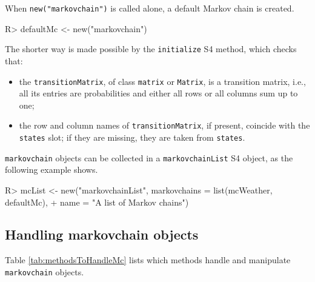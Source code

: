 \documentclass[
  nojss]{jss}
\providecommand{\tightlist}{%
  \setlength{\itemsep}{0pt}\setlength{\parskip}{0pt}}
\begin{document}
When \texttt{new("markovchain")} is called alone, a default Markov chain is created.

\begin{CodeChunk}
\begin{CodeInput}
R> defaultMc <- new("markovchain")
\end{CodeInput}
\end{CodeChunk}

The shorter way is made possible by the \texttt{initialize} S4 method, which checks that:

\begin{itemize}
\tightlist
\item
  the \texttt{transitionMatrix}, of class \texttt{matrix} or \texttt{Matrix}, is a transition matrix, i.e., all its entries are probabilities and either all rows or all columns sum up to one;
\item
  the row and column names of \texttt{transitionMatrix}, if present, coincide with the \texttt{states} slot; if they are missing, they are taken from \texttt{states}.
\end{itemize}

\texttt{markovchain} objects can be collected in a \texttt{markovchainList} S4 object, as the following example shows.

\begin{CodeChunk}
\begin{CodeInput}
R> mcList <- new("markovchainList", markovchains = list(mcWeather, defaultMc), 
+                 name = "A list of Markov chains")
\end{CodeInput}
\end{CodeChunk}

\subsection{Handling markovchain objects}\label{handling-markovchain-objects}

Table \ref{tab:methodsToHandleMc} lists which methods handle and manipulate \texttt{markovchain} objects.
\end{document}
